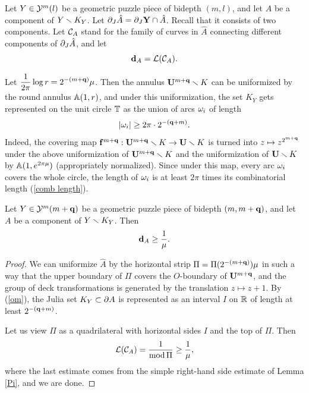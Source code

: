 Let $Y\in {\mathcal Y}^m(l)$ be a geometric puzzle piece of bidepth $(m,l)$,
and let $A$ be a component of $Y\smallsetminus K_Y$. Let $\partial_J \hat A = \partial_J {\mathbf{Y}} \cap \hat A $.
Recall that it consists of two components.
Let ${\mathcal C}_A$ stand for the family of curves in $\hat A$
connecting  different  components of $\partial_J \hat A$,
and let
$$
  {\mathbf{d}}_A = {\mathcal L}({\mathcal C}_A).
$$

Let $\displaystyle{\frac{1}{2\pi}\log r= 2^{-(m+{\mathbf{q}})}\mu}$.
Then the annulus ${\mathbf{U}}^{m+{\mathbf{q}}}\smallsetminus K$ can be uniformized by the round annulus
${\Bbb A}(1,r)$, and under this uniformization,
the set $K_Y$ gets represented on the unit circle ${\Bbb T}$ as the union of arcs ${\omega}_i$
of length
\begin{equation}\label{om}
    |{\omega}_i|  \geq 2\pi\cdot 2^{-({\mathbf{q}}+m)} .
\end{equation}
Indeed, the covering map ${\mathbf{f}}^{m+{\mathbf{q}}}: {\mathbf{U}}^{m+{\mathbf{q}}} \smallsetminus K\rightarrow {\mathbf{U}}\smallsetminus K$
is turned into $z\mapsto z^{2^{m+{\mathbf{q}}}}$ under the above uniformization of ${\mathbf{U}}^{m+{\mathbf{q}}} \smallsetminus K$
and the uniformization of ${\mathbf{U}}\smallsetminus K$ by ${\Bbb A}(1, e^{2\pi\mu})$ (appropriately normalized).
Since under this map, every arc ${\omega}_i$ covers the whole circle,
the length of ${\omega}_i$  is at least $2\pi$ times its combinatorial length (\ref{comb length}).

\begin{lem}\label{m-m}
  Let  $Y\in {\mathcal Y}^m(m+{\mathbf{q}})$ be a geometric puzzle piece of bidepth $(m,m+{\mathbf{q}})$,
and let $A$ be a component of $Y\smallsetminus K_Y$. Then
$$
   {\mathbf{d}}_A \geq \frac{1}{\mu}.
$$
\end{lem}

\begin{proof}
%
We can uniformize $\hat A$ by the horizontal  strip $\Pi=\Pi(2^{-(m+{\mathbf{q}})})\mu$
 in such a way that the upper boundary
of $\Pi$ covers the $O$-boundary of ${\mathbf{U}}^{m+{\mathbf{q}}}$, and the group of deck transformations is generated by
the translation $z\mapsto z+1$. By (\ref{om}),
the Julia set $K_Y\subset \partial A$ is represented
as an interval $I$ on ${\Bbb R}$ of length at least $2^{-({\mathbf{q}}+m)}$.

Let us view $\Pi$ as a quadrilateral with horizontal sides $I$ and the top of $\Pi$.
Then
$$
   {\mathcal L}({\mathcal C}_A)= \frac{1}{\operatorname{mod} \Pi} \geq \frac{1}{\mu },
$$
where the last estimate comes from the simple right-hand side estimate  of Lemma \ref{Pi},
and we are done.
%
\end{proof}

